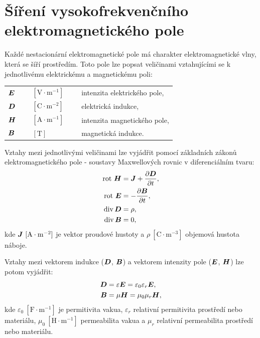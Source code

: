 \documentclass[12pt,a4paper,oneside]{article}
\numberwithin{equation}{section} %
\numberwithin{figure}{section} %
\numberwithin{table}{section} %
\renewcommand{\vec}[1]{\mbox{\boldmath$#1$}} %
\newcommand{\rot}{\mathrm{rot}\ }
\begin{document}
\newpage

\section{Šíření vysokofrekvenčního elektromagnetického pole}
Každé nestacionární elektromagnetické pole má charakter elektromagnetické vlny, která se šíří prostředím. Toto pole lze popsat veličinami vztahujícími se k jednotlivému elektrickému a magnetickému poli:
\begin{table}[h] %
\begin{center} %
\begin{tabular}{l l l}
$\vec{E}$~~~ & $\mathrm{[V \cdot m^{-1}]}$~~~ & intenzita elektrického pole, \\ 
$\vec{D}$ & $\mathrm{[C \cdot m^{-2}]}$ & elektrická indukce, \\ 
$\vec{H}$ & $\mathrm{[A \cdot m^{-1}]}$ & intenzita magnetického pole, \\ 
$\vec{B}$ & $\mathrm{[T]}$ & magnetická indukce. \\ 
\end{tabular} 
\end{center}
\end{table}

Vztahy mezi jednotlivými veličinami lze vyjádřit pomocí základních zákonů elektromagnetického pole - soustavy Maxwellových rovnic v diferenciálním tvaru:
\begin{subequations}
\begin{align}
\label{maxdif1}
\rot \vec{H} &= \vec{J} + \frac{\partial \vec{D}}{\partial t},
\\
\label{maxdif2}
\rot \vec{E} &= - \frac{\partial \vec{B}}{\partial t},
\\
\label{maxdif3}
\udiv \vec{D} &= \rho,
\\
\label{maxdif4}
\udiv \vec{B} &= 0,
\end{align}
\end{subequations}
kde $\vec{J} ~\mathrm{[A \cdot m^{-2}]}$ je vektor proudové hustoty a $\rho ~\mathrm{[C \cdot m^{-3}]}$ objemová hustota náboje. 

Vztahy mezi vektorem indukce ($\vec{D}$, $\vec{B}$) a vektorem intenzity pole ($\vec{E}$, $\vec{H}$) lze potom vyjádřit:
\begin{subequations}
\begin{align}
\label{epsilonE}
\vec{D} &= \varepsilon \vec{E} = \varepsilon _0 \varepsilon _r \vec{E},
\\
\label{muH}
\vec{B} &= \mu \vec{H} = \mu _0 \mu _r \vec{H},
\end{align}
\end{subequations}
kde $\varepsilon _0 ~\mathrm{[F \cdot m^{-1}]}$ je permitivita vakua, $\varepsilon _r$ relativní permitivita prostředí nebo materiálu, $\mu _0 ~\mathrm{[H \cdot m^{-1}]}$ permeabilita vakua a $\mu _r$ relativní permeabilita prostředí nebo materiálu.
\end{document}
